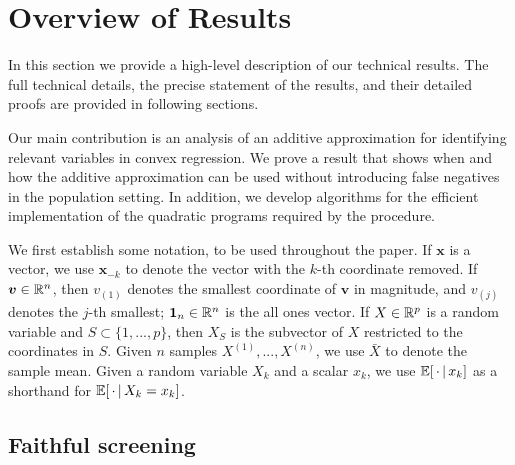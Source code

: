 \def\x{\mathbf{x}}

\section{Overview of Results}

In this section we provide a high-level description of our technical
results.  The full technical details, the precise statement of the
results, and their detailed proofs are provided in following sections.

Our main contribution is an analysis of an additive approximation for identifying
relevant variables in convex regression.  
We prove a result that shows when and how the additive approximation
can be used without introducing false negatives in the population
setting.  In addition, we develop algorithms for the efficient implementation of
the quadratic programs required by the procedure.  

We first establish some notation, to be used throughout the  paper.
If $\mathbf{x}$ is a vector, we use $\mathbf{x}_{-k}$ to denote the
vector with the $k$-th coordinate removed. If $\mbox{\boldmath $v$} \in {\mathbb R}^n$, then
$v_{(1)}$ denotes the smallest coordinate of $\mathbf{v}$ in
magnitude, and $v_{(j)}$ denotes the $j$-th smallest; $\mbox{\boldmath $1$}_n \in {\mathbb R}^n$
is the all ones vector. If $X \in {\mathbb R}^p$ is a random variable and $S \subset
\{1,...,p\}$, then $X_S$ is the subvector of $X$ restricted to
the coordinates in $S$. Given $n$ samples $X^{(1)},...,X^{(n)}$, we use
$\bar{X}$ to denote the sample mean. Given a random variable
$X_k$ and a scalar $x_k$, we use ${\mathbb E}[\,\cdot {\,|\,} x_k]$ as a shorthand
for ${\mathbb E}[\, \cdot {\,|\,} X_k = x_k]$.


\subsection{Faithful screening}

